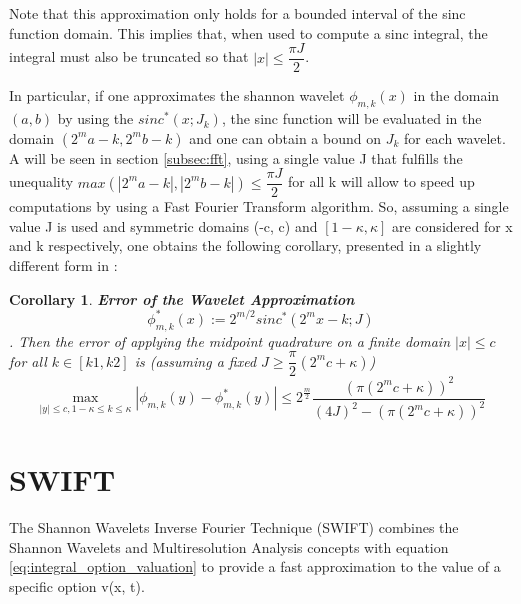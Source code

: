 \documentclass[12,twoside]{mammeTFM}
\newtheorem{cor}[thm]{Corollary}
\theoremstyle{definition}
\theoremstyle{remark}
\begin{document}
Note that this approximation only holds for a bounded interval of the sinc function domain. This implies that, when used to compute a sinc integral, the integral must also be truncated so that $|x| \leq \dfrac{\pi J}{2}$.

In particular, if one approximates the shannon wavelet $\phi_{m,k}(x)$ in the domain $(a, b)$ by using the $sinc^{*}(x;J_k)$, the sinc function will be evaluated in the domain $(2^m a - k, 2^m b - k)$ and one can obtain a bound on $J_k$ for each wavelet. A will be seen in section \ref{subsec:fft}, using a single value J that fulfills the unequality $max(|2^m a - k|, |2^m b - k|) \leq \dfrac{\pi J}{2}$ for all k will allow to speed up computations by using a Fast Fourier Transform algorithm. So, assuming a single value J is used and symmetric domains (-c, c) and $[1 - \kappa, \kappa]$ are considered for x and k respectively, one obtains the following corollary, presented in a slightly different form in \cite{mar17}:
\begin{cor} \textbf{Error of the Wavelet Approximation}
\begin{equation}
\phi_{m,k}^{*}(x) := 2^{m/2} sinc^{*}(2^m x -k; J)
\end{equation}
. Then the error of applying the midpoint quadrature on a finite domain $|x| \leq c$ for all $k \in [k1, k2]$ is (assuming a fixed $J \geq \dfrac{\pi}{2}(2^m c + \kappa)$) 
\begin{equation}
\max _{|y| \leq c, 1-\kappa \leq k \leq \kappa}\left|\phi_{m, k}(y)-\phi_{m, k}^{*}(y)\right| \leq 2^{\frac{m}{2}} \frac{\left(\pi\left(2^{m} c+\kappa\right)\right)^{2}}{(4 J)^{2}-\left(\pi\left(2^{m} c+\kappa\right)\right)^{2}}
\end{equation}
\end{cor}


\section{SWIFT} \label{chapter:swift}

The Shannon Wavelets Inverse Fourier Technique (SWIFT) combines the Shannon Wavelets and Multiresolution Analysis concepts with equation \ref{eq:integral_option_valuation} to provide a fast approximation to the value of a specific option v(x, t).
\end{document}
